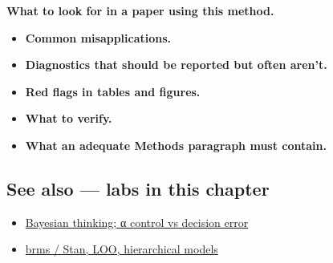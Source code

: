 \documentclass[
]{article}
\providecommand{\tightlist}{%
  \setlength{\itemsep}{0pt}\setlength{\parskip}{0pt}}
\begin{document}
\textbf{What to look for in a paper using this method.}

\begin{itemize}
\tightlist
\item
  \textbf{Common misapplications.}
\item
  \textbf{Diagnostics that should be reported but often aren't.}
\item
  \textbf{Red flags in tables and figures.}
\item
  \textbf{What to verify.}
\item
  \textbf{What an adequate Methods paragraph must contain.}
\end{itemize}

\subsection{See also --- labs in this
chapter}\label{see-also-labs-in-this-chapter}

\begin{itemize}
\tightlist
\item
  \href{labs/lab-bayesian-thinking-control-vs-decision-error.Rmd}{Bayesian
  thinking; α control vs decision error}
\item
  \href{labs/lab-brms-stan-loo-hierarchical-models.Rmd}{brms / Stan,
  LOO, hierarchical models}
\end{itemize}
\end{document}
